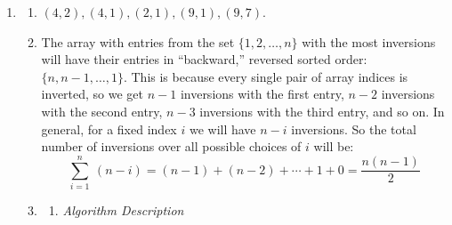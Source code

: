 \documentclass{article}
\begin{document}
\begin{enumerate}[leftmargin={*}, font={\bf}, label={\arabic*.}, ref={\arabic*}]
\begin{enumerate}
        \[
          T(n, k) =
            \begin{cases}
              n & \text{if}\ k = 1 \\ 
              T(n_1, \floor{k/2}) + T(n_2, \ceil{k/2}) + n & \text{otherwise}
            \end{cases}
        \]

        To solve this recurrence, we proceed with the recursion tree approach. For simplicity
        assume $k$ is a power of $2$. Then the recursion tree is a complete binary tree with $k$
        nodes at the leaves and depth $\log k$. The work at the root node is $n$.  At the next
        level is $n_1 + n_2$ which is $n$. Each level incurs an $\O(n)$ cost and there are $\log
        k$ levels hence the total work is $\O(n \log k)$. \hfill $\square$
    \end{enumerate}

  \item \label{qst:2}
    \begin{enumerate}
      \item \label{qst:2a}
        $(4,2), (4,1), (2,1), (9,1), (9,7)$.

      \item \label{qst:2b}
        The array with entries from the set $\{1, 2, \ldots, n\}$ with the most inversions will
        have their entries in ``backward,'' reversed sorted order: $\{n, n-1, \ldots, 1\}$. This
        is because every single pair of array indices is inverted, so we get $n-1$ inversions
        with the first entry, $n-2$ inversions with the second entry, $n-3$ inversions with the
        third entry, and so on. In general, for a fixed index $i$ we will have $n-i$ inversions.
        So the total number of inversions over all possible choices of $i$ will be:
        \[
          \sum_{i=1}^{n}\ (n-i) = (n-1) + (n-2) + \cdots + 1 + 0 = \frac{n(n-1)}{2}
        \]

      \item \label{qst:2c}
        \begin{enumerate}[leftmargin={*}, label={\arabic*.}]
          \item
            {\it Algorithm Description}


\end{enumerate}
\end{enumerate}
\end{enumerate}
\end{document}
